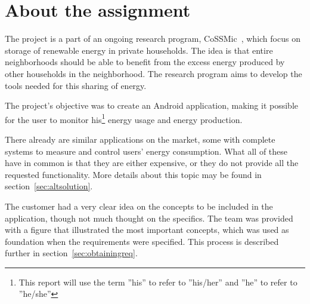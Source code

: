 \section{About the assignment}

The project is a part of an ongoing research program, CoSSMic~\cite{cossmic}, which focus on storage of renewable energy in private households. 
The idea is that entire neighborhoods should be able to benefit from the excess energy produced by other households in the neighborhood. 
The research program aims to develop the tools needed for this sharing of energy. 

The project's objective was to create an Android application, making it possible for the user to monitor his\footnote{This report will use the term ''his'' to refer to ''his/her'' and ''he'' to refer to ''he/she''} 
energy usage and energy production. 

There already are similar applications on the market, some with complete systems to measure and control users' energy consumption. 
What all of these have in common is that they are either expensive, or they do not provide all the requested functionality. More details about this topic may be found in section~\ref{sec:altsolution}.

The customer had a very clear idea on the concepts to be included in the application, though not much thought on the specifics. The team was provided with a figure that illustrated the most important concepts, which was used as foundation when the requirements were specified. 
This process is described further in section~\ref{sec:obtainingreq}.